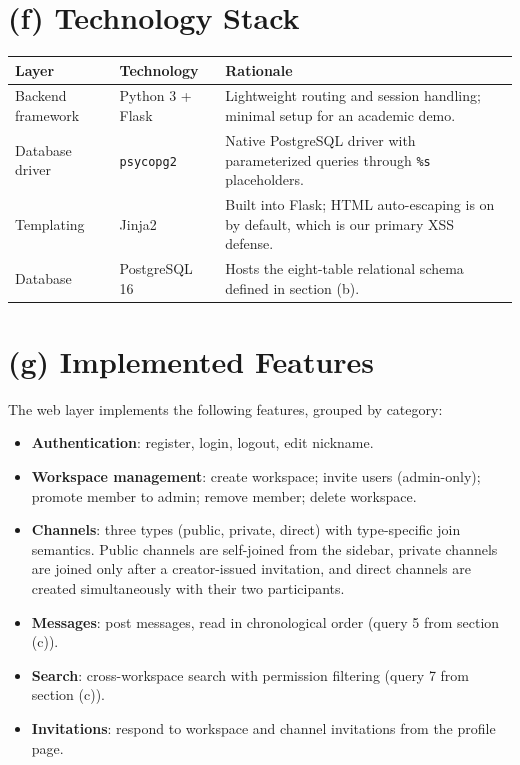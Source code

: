 \documentclass[11pt,letterpaper]{article}
\begin{document}
\section*{(f) Technology Stack}

\begin{center}
\begin{tabular}{|l|l|p{8.4cm}|}
\hline
\textbf{Layer} & \textbf{Technology} & \textbf{Rationale} \\ \hline
Backend framework & Python 3 + Flask & Lightweight routing and session
handling; minimal setup for an academic demo. \\ \hline
Database driver & \texttt{psycopg2} & Native PostgreSQL driver with
parameterized queries through \texttt{\%s} placeholders. \\ \hline
Templating & Jinja2 & Built into Flask; HTML auto-escaping is on by default,
which is our primary XSS defense. \\ \hline
Database & PostgreSQL 16 & Hosts the eight-table relational schema defined
in section (b). \\ \hline
\end{tabular}
\end{center}

\section*{(g) Implemented Features}

The web layer implements the following features, grouped by category:

\begin{itemize}[leftmargin=1.4em,itemsep=2pt]
  \item \textbf{Authentication}: register, login, logout, edit nickname.
  \item \textbf{Workspace management}: create workspace; invite users
        (admin-only); promote member to admin; remove member; delete
        workspace.
  \item \textbf{Channels}: three types (public, private, direct) with
        type-specific join semantics. Public channels are self-joined
        from the sidebar, private channels are joined only after a
        creator-issued invitation, and direct channels are created
        simultaneously with their two participants.
  \item \textbf{Messages}: post messages, read in chronological order
        (query 5 from section (c)).
  \item \textbf{Search}: cross-workspace search with permission filtering
        (query 7 from section (c)).
  \item \textbf{Invitations}: respond to workspace and channel invitations
        from the profile page.
\end{itemize}
\end{document}
